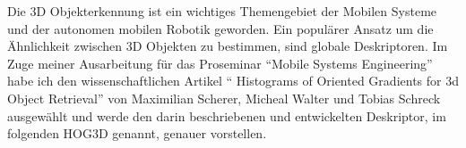 Die 3D Objekterkennung ist ein wichtiges Themengebiet der Mobilen Systeme und der autonomen mobilen Robotik geworden.
Ein populärer Ansatz um die Ähnlichkeit zwischen 3D Objekten zu bestimmen, sind globale Deskriptoren. Im Zuge
meiner Ausarbeitung für das Proseminar "`Mobile Systems Engineering"' habe ich den wissenschaftlichen Artikel 
"` Histograms of Oriented Gradients for 3d Object Retrieval"' von  Maximilian Scherer, Micheal Walter und Tobias Schreck 
ausgewählt und werde den darin beschriebenen und entwickelten  Deskriptor, im folgenden HOG3D genannt, genauer vorstellen.